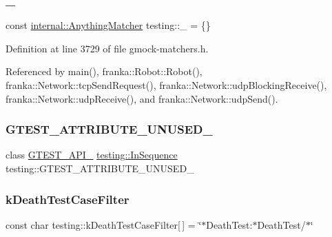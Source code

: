 \subsubsection{\texorpdfstring{\+\_\+}{\_}}
{\footnotesize\ttfamily const \hyperlink{classtesting_1_1internal_1_1AnythingMatcher}{internal\+::\+Anything\+Matcher} testing\+::\+\_\+ = \{\}}



Definition at line 3729 of file gmock-\/matchers.\+h.



Referenced by main(), franka\+::\+Robot\+::\+Robot(), franka\+::\+Network\+::tcp\+Send\+Request(), franka\+::\+Network\+::udp\+Blocking\+Receive(), franka\+::\+Network\+::udp\+Receive(), and franka\+::\+Network\+::udp\+Send().

\mbox{\label{namespacetesting_ae028f80705ba0f84ce7d036bf3793448}} 
\subsubsection{\texorpdfstring{G\+T\+E\+S\+T\+\_\+\+A\+T\+T\+R\+I\+B\+U\+T\+E\+\_\+\+U\+N\+U\+S\+E\+D\+\_\+}{GTEST\_ATTRIBUTE\_UNUSED\_}}
{\footnotesize\ttfamily class \hyperlink{gtest-port_8h_aa73be6f0ba4a7456180a94904ce17790}{G\+T\+E\+S\+T\+\_\+\+A\+P\+I\+\_\+} \hyperlink{classtesting_1_1InSequence}{testing\+::\+In\+Sequence}  testing\+::\+G\+T\+E\+S\+T\+\_\+\+A\+T\+T\+R\+I\+B\+U\+T\+E\+\_\+\+U\+N\+U\+S\+E\+D\+\_\+}

\mbox{\label{namespacetesting_a23c33f4bfcc3c2e5e620eff31a98892d}} 
\subsubsection{\texorpdfstring{k\+Death\+Test\+Case\+Filter}{kDeathTestCaseFilter}}
{\footnotesize\ttfamily const char testing\+::k\+Death\+Test\+Case\+Filter\mbox{[}$\,$\mbox{]} = \char`\"{}$\ast$Death\+Test\+:$\ast$Death\+Test/$\ast$\char`\"{}\hspace{0.3cm}{\ttfamily [static]}}



